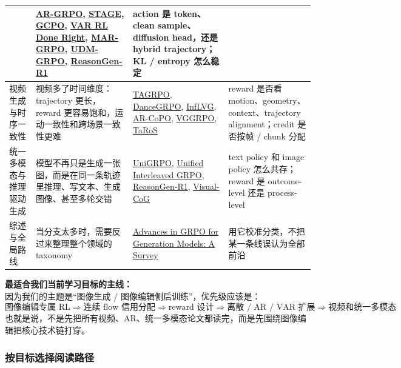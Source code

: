 {\begin{longtable}{p{2.45cm}p{3.7cm}p{5.8cm}p{3.3cm}}
&
\href{https://arxiv.org/abs/2508.06924}{AR-GRPO},
\href{https://arxiv.org/abs/2509.25027}{STAGE},
\href{https://arxiv.org/abs/2509.22485}{GCPO},
\href{https://arxiv.org/abs/2601.02256}{VAR RL Done Right},
\href{https://arxiv.org/abs/2604.06966}{MAR-GRPO},
\href{https://arxiv.org/abs/2604.18518}{UDM-GRPO},
\href{https://arxiv.org/abs/2505.24875}{ReasonGen-R1}
&
action 是 token、clean sample、diffusion head，还是 hybrid trajectory；KL / entropy 怎么稳定
\\
\hline
视频生成与时序一致性
&
视频多了时间维度：trajectory 更长，reward 更容易饱和，运动一致性和跨场景一致性更难
&
\href{https://arxiv.org/abs/2601.05729}{TAGRPO},
\href{https://arxiv.org/abs/2505.07818}{DanceGRPO},
\href{https://arxiv.org/abs/2505.17574}{InfLVG},
\href{https://arxiv.org/abs/2603.17461}{AR-CoPO},
\href{https://arxiv.org/abs/2603.26599}{VGGRPO},
\href{https://arxiv.org/abs/2511.19356}{TaRoS}
&
reward 是否看 motion、geometry、context、trajectory alignment；credit 是否按帧 / chunk 分配
\\
\hline
统一多模态与推理驱动生成
&
模型不再只是生成一张图，而是在同一条轨迹里推理、写文本、生成图像、甚至多轮交错
&
\href{https://arxiv.org/abs/2603.23500}{UniGRPO},
\href{https://arxiv.org/abs/2603.09538}{Unified Interleaved GRPO},
\href{https://arxiv.org/abs/2505.24875}{ReasonGen-R1},
\href{https://arxiv.org/abs/2508.18032}{Visual-CoG}
&
text policy 和 image policy 怎么共存；reward 是 outcome-level 还是 process-level
\\
\hline
综述与全局路线
&
当分支太多时，需要反过来整理整个领域的 taxonomy
&
\href{https://arxiv.org/abs/2603.06623}{Advances in GRPO for Generation Models: A Survey}
&
用它校准分类，不把某一条线误认为全部前沿
\\
\hline
\end{longtable}
}

\begin{summarybox}
\textbf{最适合我们当前学习目标的主线：}\\
因为我们的主题是“图像生成 / 图像编辑侧后训练”，优先级应该是：
\[
\text{图像编辑专属 RL}
\Rightarrow
\text{连续 flow 信用分配}
\Rightarrow
\text{reward 设计}
\Rightarrow
\text{离散 / AR / VAR 扩展}
\Rightarrow
\text{视频和统一多模态}
\]
也就是说，不是先把所有视频、AR、统一多模态论文都读完，而是先围绕图像编辑把核心技术链打穿。
\end{summarybox}

\subsubsection{按目标选择阅读路径}

